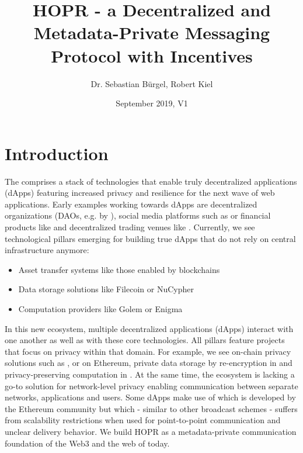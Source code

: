\documentclass{article}
\title{HOPR - a Decentralized and Metadata-Private Messaging Protocol with Incentives}
\author{Dr. Sebastian B\"urgel, Robert Kiel}
\date{September 2019, V1}
\newcommand{\MYhref}[3][blue]{\href{#2}{\color{#1}{#3}}}%
\begin{document}
\maketitle

\section{Introduction}

The \MYhref{http://gavwood.com/web3lt.html}{Web3} comprises a stack of technologies that enable truly decentralized applications (dApps) featuring increased privacy and resilience for the next wave of web applications. Early examples working towards dApps are decentralized organizations (DAOs, e.g. by \MYhref{https://aragon.org}{Aragon}), social media platforms such as \MYhref{https://akasha.world}{Akasha} or financial products like \MYhref{https://makerdao.com/en/dai}{Maker's DAI} and decentralized trading venues like \MYhref{https://uniswap.exchange}{Uniswap}. Currently, we see technological pillars emerging for building true dApps that do not rely on central infrastructure anymore:
\begin{itemize}
    \item Asset transfer systems like those enabled by blockchains
    \item Data storage solutions like Filecoin or NuCypher
    \item Computation providers like Golem or Enigma
\end{itemize}
In this new ecosystem, multiple decentralized applications (dApps) interact with one another as well as with these core technologies. All pillars feature projects that focus on privacy within that domain. For example, we see on-chain privacy solutions such as \MYhref{https://z.cash/}{ZCash}, \MYhref{https://www.aztecprotocol.com}{AZTEC} or \MYhref{http://matterlabs.dev}{MatterLabs} on Ethereum, private data storage by re-encryption in \MYhref{https://www.nucypher.com/}{NuCypher} and privacy-preserving computation in \MYhref{https://enigma.co}{Enigma}. At the same time, the ecosystem is lacking a go-to solution for network-level privacy enabling communication between separate networks, applications and users. Some dApps make use of \MYhref{https://github.com/ethereum/wiki/wiki/Whisper}{Whisper} which is developed by the Ethereum community but which - similar to other broadcast schemes - suffers from scalability restrictions when used for point-to-point communication and unclear delivery behavior. We build HOPR as a metadata-private communication foundation of the Web3 and the web of today.
\end{document}
